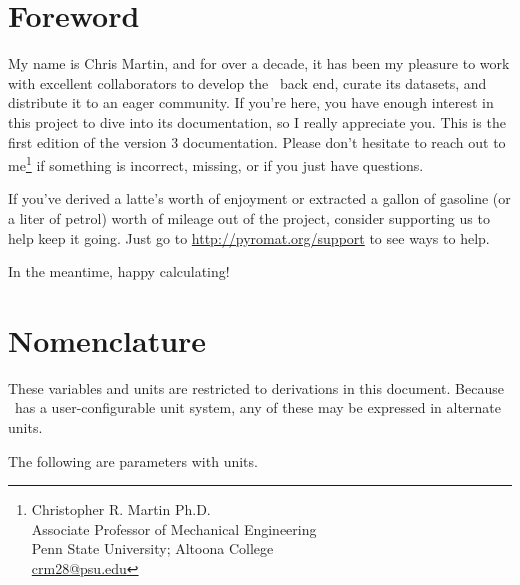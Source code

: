 \section*{Foreword}\label{sec:foreword}

My name is Chris Martin, and for over a decade, it has been my pleasure to work with excellent collaborators to develop the \PM\ back end, curate its datasets, and distribute it to an eager community.  If you're here, you have enough interest in this project to dive into its documentation, so I really appreciate you.  This is the first edition of the version 3 documentation.  Please don't hesitate to reach out to me\footnote{Christopher R. Martin Ph.D.\\Associate Professor of Mechanical Engineering\\Penn State University; Altoona College\\\href{mailto:crm28@psu.edu}{crm28@psu.edu}} if something is incorrect, missing, or if you just have questions.

If you've derived a latte's worth of enjoyment or extracted a gallon of gasoline (or a liter of petrol) worth of mileage out of the project, consider supporting us to help keep it going.  Just go to \url{http://pyromat.org/support} to see ways to help.

In the meantime, happy calculating!

\section*{Nomenclature}\label{sec:nom}

These variables and units are restricted to derivations in this document.  Because \PM\ has a user-configurable unit system, any of these may be expressed in alternate units.  

The following are parameters with units.

